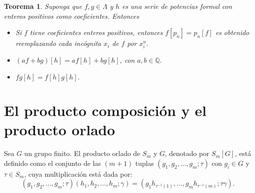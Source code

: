 \documentclass[12pt]{book}
\newtheorem{theorem}{Teorema}[section]
\theoremstyle{definition}
\newcounter{in}
\newcounter{ini}
\begin{document}
\begin{theorem}
  \label{ple_pr}
  Suponga que $f, g \in \Lambda$ y $h$ es una serie de potencias
  formal con enteros positivos como coeficientes. Entonces
\begin{itemize}
\item Si $f$ tiene coeficientes enteros positivos, entonces
  $f \left [ p_{n} \right ] = p_{n} \left [ f \right ]$ es obtenido
  reemplazando cada incógnita $x_{i}$ de $f$ por $x_{i}^{n}.$
\item $(af + bg) \left [ h \right ] = af \left [ h \right ] + bg \left [ h \right ]$, con $a,b \in \mathbb{Q}.$
\item $fg \left [ h \right ] = f \left [ h \right ] g \left [ h \right ].$
\end{itemize} 
\end{theorem}
\section{El producto composición y el producto orlado}
\label{pr_or}
Sea $G$ un grupo finito. El producto orlado de $S_m$ y $G$, denotado
por $S_m\left [ G \right ]$, está definido como el conjunto de las
$(m+1)$ tuplas $(g_1,g_2, \ldots, g_m ; \tau)$ con $g_i \in G$ y
$\tau \in S_m$, cuya multiplicación está dada por: 
\begin{equation*}
(g_1,g_2, \ldots, g_m ; \tau)(h_1,h_2, \ldots, h_m ; \gamma) = (g_{1} h_{\tau^{-1}(1)}, \ldots, g_{m} h_{\tau^{-1}(m)}; \tau \gamma).
\end{equation*}
\end{document}
